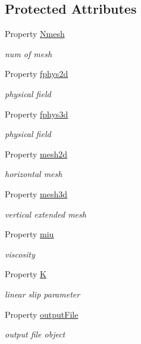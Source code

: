 \subsection*{Protected Attributes}
\begin{DoxyCompactItemize}
\item 
Property \hyperlink{class_l_s_w_e_abstract3d_a8d7bbc8fc10f7b77d82c3eebcce635fe}{Nmesh}
\begin{DoxyCompactList}\small\item\em num of mesh \end{DoxyCompactList}\item 
Property \hyperlink{class_l_s_w_e_abstract3d_ac109e689a672a973a96c1068a45cf15c}{fphys2d}
\begin{DoxyCompactList}\small\item\em physical field \end{DoxyCompactList}\item 
Property \hyperlink{class_l_s_w_e_abstract3d_a85a25b72732b21d0d624e9f88ed52dc4}{fphys3d}
\begin{DoxyCompactList}\small\item\em physical field \end{DoxyCompactList}\item 
Property \hyperlink{class_l_s_w_e_abstract3d_a4beeec1f4e6ca6bad1ba097705ddce0a}{mesh2d}
\begin{DoxyCompactList}\small\item\em horizontal mesh \end{DoxyCompactList}\item 
Property \hyperlink{class_l_s_w_e_abstract3d_adb1ef51320a4c12fa7800f9dba15b3a2}{mesh3d}
\begin{DoxyCompactList}\small\item\em vertical extended mesh \end{DoxyCompactList}\item 
Property \hyperlink{class_l_s_w_e_abstract3d_a3c5f3eb1ca036620024c6b52e0869030}{miu}
\begin{DoxyCompactList}\small\item\em viscosity \end{DoxyCompactList}\item 
Property \hyperlink{class_l_s_w_e_abstract3d_a10ea86821a87f4de6f0132edb5dc8869}{K}
\begin{DoxyCompactList}\small\item\em linear slip parameter \end{DoxyCompactList}\item 
Property \hyperlink{class_l_s_w_e_abstract3d_a1a68940e09f9a104e56d26761934bc49}{output\+File}
\begin{DoxyCompactList}\small\item\em output file object \end{DoxyCompactList}\end{DoxyCompactItemize}


